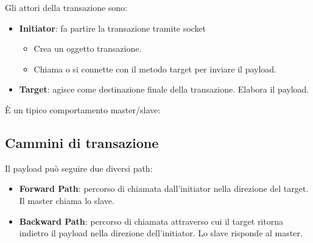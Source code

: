 \documentclass[a4paper]{article}
\begin{document}
			\noindent
			Gli attori della transazione sono:
			\begin{itemize}
				\item \textbf{Initiator}: fa partire la transazione tramite socket
				\begin{itemize}
					\item Crea un oggetto transazione.
					\item Chiama o si connette con il metodo target per inviare il payload.
				\end{itemize}
				\item \textbf{Target}: agisce come destinazione finale della transazione. Elabora il payload.
			\end{itemize}
	
			\noindent
			È un tipico comportamento master/slave:
			\bigskip
			
			\begin{center}
			\end{center}
			
		\subsection{Cammini di transazione}
			Il payload può seguire due diversi path:
			\begin{itemize}
				\item \textbf{Forward Path}: percorso di chiamata dall'initiator nella direzione del target. Il master chiama lo slave.
				\item \textbf{Backward Path}: percorso di chiamata attraverso cui il target ritorna indietro il payload nella direzione dell'initiator. Lo slave risponde al master.
			\end{itemize}
		
			\begin{center}
			\end{center}
			
\end{document}
